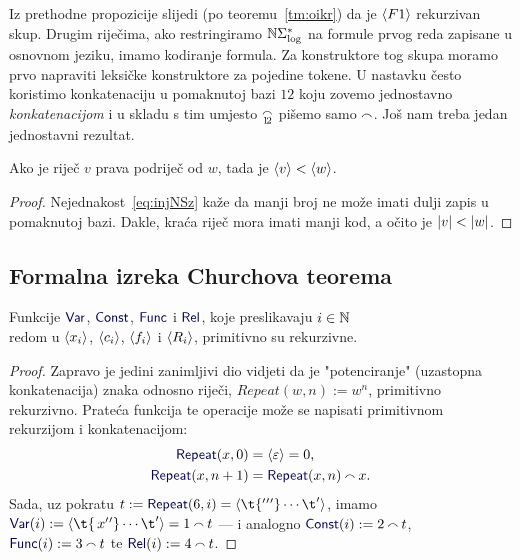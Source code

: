 Iz prethodne propozicije slijedi (po teoremu~\ref{tm:oikr}) da je $\langle F1\rangle$ rekurzivan skup. Drugim riječima, ako restringiramo ${\mathbb N}\Sigma_{\log}^*$ na formule prvog reda zapisane u osnovnom jeziku, imamo kodiranje formula. Za konstruktore tog skupa moramo prvo napraviti leksičke konstruktore za pojedine tokene. U nastavku često koristimo konkatenaciju u pomaknutoj bazi $12$ koju zovemo jednostavno \emph{konkatenacijom} i u skladu s tim umjesto $\conc{1\!2}$ pišemo samo $\conc{}$. Još nam treba jedan jednostavni rezultat.

\begin{korolar}[{name=[(prava) podriječ ima (strogo) manji kod]}]\label{kor:krvw}
Ako je riječ $v$ prava podriječ od $w$, tada je $\langle v\rangle<\langle w\rangle$.
\end{korolar}
\begin{proof}
    Nejednakost~\eqref{eq:injNSz} kaže da manji broj ne može imati dulji zapis u pomaknutoj bazi. Dakle, kraća riječ mora imati manji kod, a očito je $\lvert v\rvert<\lvert w\rvert$.
\end{proof}

\subsection{Formalna izreka Churchova teorema}

\begin{lema}[{name=[primitivna rekurzivnost leksičke strukture formula prvog reda]}]\label{lm:lexF1}
Funkcije $\f{Var}$, $\f{Const}$, $\f{Func}$ i $\f{Rel}$, koje preslikavaju $i\in{\mathbb N}$\\ redom u $\langle x_i\rangle$, $\langle c_i\rangle$, $\langle f_i\rangle$ i $\langle R_i\rangle$, primitivno su rekurzivne.
\end{lema}
\begin{proof}
Zapravo je jedini zanimljivi dio vidjeti da je "potenciranje" (uzastopna konkatenacija) znaka odnosno riječi, $Repeat(w,n):=w^n$, primitivno rekurzivno. Prateća funkcija te operacije može se napisati primitivnom rekurzijom i konkatenacijom:
\begin{align}
    \f{Repeat}(x,0)&=\kr{\varepsilon}=0\text,\\
    \f{Repeat}(x,n+1)&=\f{Repeat}(x,n)\conc{}x\text.
\end{align}
    Sada, uz pokratu $t:=\f{Repeat}(6,i)=\kr{\t{'{}'{}'}\dotsm\t'}$, imamo $\f{Var}(i):=\kr{\t{\,x{}'{}'}\dotsm\t'}=1\conc{}t$ --- i analogno $\f{Const}(i):=2\conc{}t$, $\f{Func}(i):=3\conc{}t$ te $\f{Rel}(i):=4\conc{}t$.
\end{proof}

